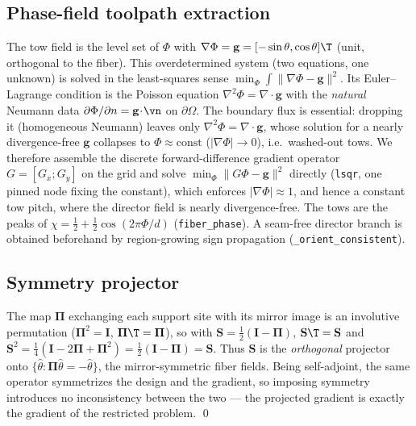 \subsection{Phase-field toolpath extraction}
The tow field is the level set of $\Phi$ with $\nabla\Phi=\mathbf g=[-\sin\theta,
\cos\theta]\T$ (unit, orthogonal to the fiber). This overdetermined system
(two equations, one unknown) is solved in the least-squares sense
$\min_\Phi\int\lVert\nabla\Phi-\mathbf g\rVert^2$. Its Euler--Lagrange condition is
the Poisson equation $\nabla^2\Phi=\nabla\!\cdot\mathbf g$ with the \emph{natural}
Neumann data $\partial\Phi/\partial n=\mathbf g\!\cdot\!\vn$ on $\partial\Omega$.
The boundary flux is essential: dropping it (homogeneous Neumann) leaves only
$\nabla^2\Phi=\nabla\!\cdot\mathbf g$, whose solution for a nearly divergence-free
$\mathbf g$ collapses to $\Phi\approx\mathrm{const}$ ($|\nabla\Phi|\!\to\!0$), i.e.\
washed-out tows. We therefore assemble the discrete forward-difference gradient
operator $G=[G_x;G_y]$ on the grid and solve $\min_\Phi\lVert G\Phi-\mathbf
g\rVert^2$ directly (\texttt{lsqr}, one pinned node fixing the constant), which
enforces $|\nabla\Phi|\approx1$, and hence a constant tow pitch, where the director field is nearly divergence-free. The tows are the
peaks of $\chi=\tfrac12+\tfrac12\cos(2\pi\Phi/d)$ (\texttt{fiber\_phase}). A
seam-free director branch is obtained beforehand by region-growing sign
propagation (\texttt{\_orient\_consistent}).

\subsection{Symmetry projector}
The map $\bm\Pi$ exchanging each support site with its mirror image is an involutive
permutation ($\bm\Pi^2=\mathbf I$, $\bm\Pi\T=\bm\Pi$), so with
$\mathbf S=\tfrac12(\mathbf I-\bm\Pi)$,
$\mathbf S\T=\mathbf S$ and
$\mathbf S^2=\tfrac14(\mathbf I-2\bm\Pi+\bm\Pi^2)=\tfrac12(\mathbf I-\bm\Pi)
=\mathbf S$. Thus $\mathbf S$ is the \emph{orthogonal} projector onto
$\{\hat\theta:\bm\Pi\hat\theta=-\hat\theta\}$, the mirror-symmetric fiber fields.
Being self-adjoint, the same operator symmetrizes the design and the gradient, so
imposing symmetry introduces no inconsistency between the two --- the projected
gradient is exactly the gradient of the restricted problem. \qed

